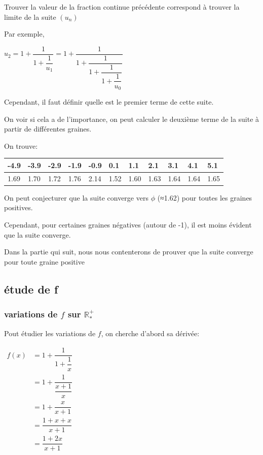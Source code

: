 \documentclass[]{scrartcl}
\begin{document}
Trouver la valeur de la fraction continue précédente correspond à
trouver la limite de la suite \((u_n)\)

Par exemple,

\(u_2 = 1 + \dfrac{1}{1 + \dfrac{1}{u_1}} = 1 + \dfrac{1}{1 + \dfrac{1}{1 + \dfrac{1}{1 + \dfrac{1}{u_0}}}}\)

Cependant, il faut définir quelle est le premier terme de cette suite.

On voir si cela a de l'importance, on peut calculer le deuxième terme de
la suite à partir de différentes graines.

On trouve:

\begin{longtable}[]{@{}lllllllllll@{}}
\toprule
-4.9 & -3.9 & -2.9 & -1.9 & -0.9 & 0.1 & 1.1 & 2.1 & 3.1 & 4.1 &
5.1\tabularnewline
\midrule
\endhead
1.69 & 1.70 & 1.72 & 1.76 & 2.14 & 1.52 & 1.60 & 1.63 & 1.64 & 1.64 &
1.65\tabularnewline
\bottomrule
\end{longtable}

On peut conjecturer que la suite converge vers \(\phi\) (≈1.62) pour
toutes les graines positives.

Cependant, pour certaines graines négatives (autour de -1), il est moins
évident que la suite converge.

Dans la partie qui suit, nous nous contenterons de prouver que la suite
converge pour toute graine positive

\hypertarget{uxe9tude-de-f}{%
\subsection{étude de f}\label{uxe9tude-de-f}}

\hypertarget{variations-de-f-sur-mathbbr_}{%
\subsubsection{\texorpdfstring{variations de \(f\) sur
\(\mathbb{R}^+_*\)}{variations de f sur \textbackslash{}mathbb\{R\}\^{}+\_*}}\label{variations-de-f-sur-mathbbr_}}

Pout étudier les variations de \(f\), on cherche d'abord sa dérivée:

\(\begin{array}{cl} f(x) &= 1 + \dfrac{1}{1 + \dfrac{1}{x}}\\[5ex] &= 1 + \dfrac{1}{\dfrac{x + 1}{x}}\\[6ex] &= 1 + \dfrac{x}{x+1}\\[4ex] &= \dfrac{1 + x + x}{x+1}\\[4ex] &= \dfrac{1 + 2x}{x+1}\\[5ex] \end{array}\)
\end{document}
